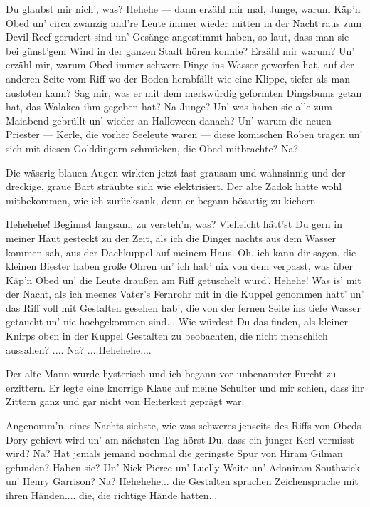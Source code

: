 \glqq Du glaubst mir nich', was? Hehehe --- dann erzähl mir mal, Junge, warum Käp'n Obed un' circa zwanzig and're Leute immer wieder mitten in der Nacht raus zum Devil Reef gerudert sind un' Gesänge angestimmt haben, so laut, dass man sie bei günst'gem Wind in der ganzen Stadt hören konnte? Erzähl mir warum? Un' erzähl mir, warum Obed immer schwere Dinge ins Wasser geworfen hat,  auf der anderen Seite vom Riff wo der Boden herabfällt wie eine Klippe, tiefer als man ausloten kann? Sag mir, was er mit dem merkwürdig geformten Dingsbums getan hat, das Walakea ihm gegeben hat? Na Junge? Un' was haben sie alle zum Maiabend gebrüllt un' wieder an Halloween danach? Un' warum die neuen Priester --- Kerle, die vorher Seeleute waren --- diese komischen Roben tragen un' sich mit diesen Golddingern schmücken, die Obed mitbrachte? Na?\grqq

Die wässrig blauen Augen wirkten jetzt fast grausam und wahnsinnig und der dreckige, graue Bart sträubte sich wie elektrisiert. Der alte Zadok hatte wohl mitbekommen, wie ich zurücksank, denn er begann bösartig zu kichern.

\glqq Hehehehe! Beginnst langsam, zu versteh'n, was? Vielleicht hätt'st Du gern in meiner Haut gesteckt zu der Zeit, als ich die Dinger nachts aus dem Wasser kommen sah, aus der Dachkuppel auf meinem Haus. Oh, ich kann dir sagen, die kleinen Biester haben große Ohren un' ich hab' nix von dem verpasst, was über Käp'n Obed un' die Leute draußen am Riff getuschelt wurd'. Hehehe! Was is' mit der Nacht, als ich meenes Vater's Fernrohr mit in die Kuppel genommen hatt' un' das Riff voll mit Gestalten gesehen hab', die von der fernen Seite ins tiefe Wasser getaucht un' nie hochgekommen sind... Wie würdest Du das finden, als kleiner Knirps oben in der Kuppel Gestalten zu beobachten, die nicht menschlich aussahen? .... Na? ....Hehehehe....\grqq

Der alte Mann wurde hysterisch und ich begann vor unbenannter Furcht zu erzittern. Er legte eine knorrige Klaue auf meine Schulter und mir schien, dass ihr Zittern ganz und gar nicht von Heiterkeit geprägt war.

\glqq Angenomm'n, eines Nachts siehste, wie was schweres jenseits des Riffs von Obeds Dory gehievt wird un' am nächsten Tag hörst Du, dass ein junger Kerl vermisst wird? Na? Hat jemals jemand nochmal die geringste Spur von Hiram Gilman gefunden? Haben sie? Un' Nick Pierce un' Luelly Waite un' Adoniram Southwick un' Henry Garrison? Na? Hehehehe... die Gestalten sprachen Zeichensprache mit ihren Händen.... die, die richtige Hände hatten...

